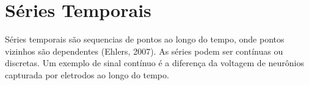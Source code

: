 \chapter{Séries Temporais}

Séries temporais são sequencias de pontos ao longo do tempo, onde pontos vizinhos são dependentes (Ehlers, 2007). 
As séries podem ser contínuas ou discretas. Um exemplo de sinal contínuo é a diferença da voltagem de neurônios
capturada por eletrodos ao longo do tempo. 

